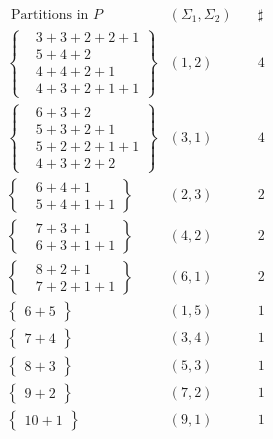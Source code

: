 \documentclass{amsart}
\begin{document}
\begin{minipage}{0.38\textwidth}
\small
\begin{align*}
& \mbox{ Partitions in $P$} &(\Sigma_{1}, \Sigma_{2})&\quad\sharp \\
&\left\{
\begin{array}{llll}
&3+3+2+2+1\\
&5+4+2\\
&4+4+2+1\\
&4+3+2+1+1
\end{array}
\right\} &(1, 2)   &\quad4 \\
&\left\{
\begin{array}{llll}
&6+3+2\\
&5+3+2+1\\
&5+2+2+1+1\\
&4+3+2+2
\end{array}
\right\} &(3,1)  &\quad4\\
&\left\{
\begin{array}{ll}
&6+4+1\\
&5+4+1+1
\end{array}
\right\} &(2,3)  &\quad2 \\
&\left\{
\begin{array}{ll}
&7+3+1\\
&6+3+1+1
\end{array}
\right\} &(4,2)  &\quad2\\
&\left\{
\begin{array}{ll}
&8+2+1\\
&7+2+1+1
\end{array}
\right\} &(6,1)  &\quad2\\
&\left\{
\begin{array}{l}
6+5
\end{array}
\right\} &(1,5)  &\quad1\\
&\left\{
\begin{array}{l}
7+4
\end{array}
\right\} &(3,4)  &\quad1\\
&\left\{
\begin{array}{l}
8+3
\end{array}
\right\} &(5,3)  &\quad1\\
&\left\{
\begin{array}{l}
9+2
\end{array}
\right\} &(7,2)  &\quad1\\
&\left\{
\begin{array}{l}
10+1
\end{array}
\right\} &(9,1)  &\quad1
 \end{align*}
\end{minipage}
\end{document}
